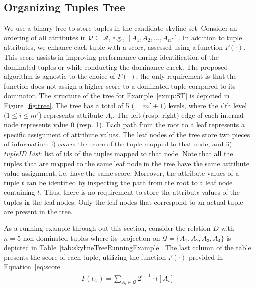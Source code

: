 \subsection{Organizing Tuples Tree}\label{subsec:tree}
\vspace{1mm}
 We use a binary tree to store tuples in the candidate skyline set. Consider an ordering of all attributes in $\mathcal{Q} \subseteq \mathcal{A}$, e.g., $[A_1, A_2, \ldots, A_{m'}]$.
In addition to tuple attributes, we enhance each tuple with a score, assessed using a function $F(\cdot)$. This score assists in improving performance during identification of the dominated tuples or while conducting the dominance check. The proposed algorithm is agnostic to the choice of $F(\cdot)$; the only requirement is that the function does not assign a higher score to a dominated tuple compared to its dominator.
The structure of the tree for Example~\ref{exmp:ST} is depicted in Figure~\ref{fig:tree}. The tree has a total of 5 ($=m'+ 1$) levels, where the $i$'th level ($1 \leq i \leq m'$) represents attribute $A_i$. The left (resp. right) edge of each internal node represents value 0 (resp. 1). Each path from the root to a leaf represents a specific assignment of attribute values. The leaf nodes of the tree 
store two pieces of information: i) $score$: the score of the tuple mapped to that node, and ii) \textit{tupleID List}: list of ids of the tuples mapped to that node. Note that all the tuples that are mapped to the same leaf node in the tree have the same attribute value assignment, i.e. have the same score.
Moreover, the attribute values of a tuple $t$ can be identified by inspecting the path from the root to a leaf node containing $t$. Thus, there is no requirement to store the attribute values of the tuples in the leaf nodes.
Only the leaf nodes that correspond to an actual tuple are present in the tree. 

\begin{exmp}\label{exmp:ST} 
As a running example through out this section, consider the relation $D$ with $n=5$ non-dominated tuples where its projection on $\mathcal{Q}=\{A_1,A_2,A_3,A_4\}$ is depicted in Table~\ref{tab:skylineTreeRunningExample}. 
The last column of the table presents the score of each tuple, utilizing the function $F(\cdot)$  provided in Equation~\ref{eq:score}.
\begin{align}\label{eq:score}
F(t_{\mathcal{Q}}) = \sum_{A_i \in \mathcal{Q}} 2^{i-1} \cdot t[A_i]
\end{align}
\end{exmp}



